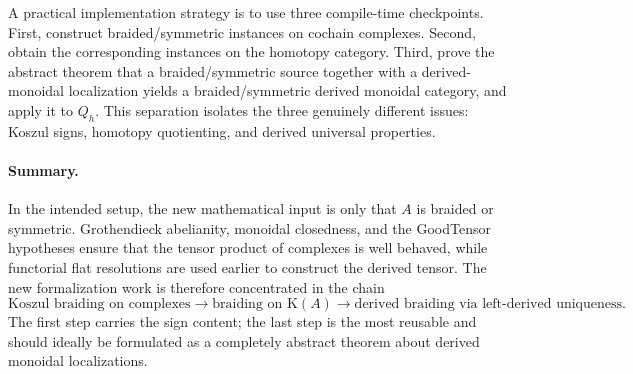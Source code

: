 \documentclass[10pt,a4paper]{article}
\newcommand{\K}{\mathrm K(A)}
\begin{document}
A practical implementation strategy is to use three compile-time checkpoints. First, construct braided/symmetric instances on cochain complexes. Second, obtain the corresponding instances on the homotopy category. Third, prove the abstract theorem that a braided/symmetric source together with a derived-monoidal localization yields a braided/symmetric derived monoidal category, and apply it to $Q_h$. This separation isolates the three genuinely different issues: Koszul signs, homotopy quotienting, and derived universal properties.

\paragraph{Summary.}
In the intended setup, the new mathematical input is only that $A$ is braided or symmetric. Grothendieck abelianity, monoidal closedness, and the GoodTensor hypotheses ensure that the tensor product of complexes is well behaved, while functorial flat resolutions are used earlier to construct the derived tensor. The new formalization work is therefore concentrated in the chain
\[
  \text{Koszul braiding on complexes}
  \longrightarrow
  \text{braiding on }\K
  \longrightarrow
  \text{derived braiding via left-derived uniqueness}.
\]
The first step carries the sign content; the last step is the most reusable and should ideally be formulated as a completely abstract theorem about derived monoidal localizations.
\end{document}
